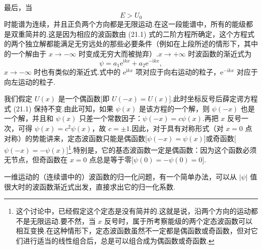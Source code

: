 最后，当
\begin{equation}
  E>U_0
\end{equation}
时能谱为连续，并且正负两个方向都是无限运动.在这一段能谱中，所有的能级都是双重简并的.这是因为相应的波函数由 (21.1) 式的二阶方程所确定，这个方程式的两个独立解都能满足无穷远处的那些必要条件（例如在上段所述的情形下，其中的一个解由于 $x\to-\infty$ 时变成无穷大而被抛弃）.$x\to+\infty$ 时波函数的渐近式为
\begin{equation}
  \psi=a_1\mathrm{e}^{\mathrm{i}kx}+a_2\mathrm{e}^{-\mathrm{i}kx},
\end{equation}
$x\to-\infty$ 时也有类似的渐近式.式中的 $\mathrm{e}^{\mathrm{i}kx}$ 项对应于向右运动的粒子，$\mathrm{e}^{-\mathrm{i}kx}$ 对应于向左运动的粒子.

我们假定 $U(x)$ 是一个偶函数[即 $U(-x)=U(x)$].此时坐标反号后薛定谔方程式 (21.1) 保持不变.由此可知，如果 $\psi(x)$ 是该方程的一个解，则 $\psi(-x)$ 也是一个解，并且和 $\psi(x)$ 只差一个常数因子：$\psi(-x)=c\psi(x)$.再把 $x$ 反号一次，可得 $\psi(x)=c^2\psi(x)$，故 $c=\pm 1$.因此，对于具有对称形式（对 $x=0$ 点对称）的势能讲来，定态波函数只能是偶函数[$\psi(-x)=\psi(x)$]或奇函数[$\psi(-x)=-\psi(x)$]\footnote{这个讨论中，已经假定这个定态是没有简并的.这就是说，沿两个方向的运动都不是无限运动.要不然，当 $x$ 反号时，属于所考察能级的两个定态波函数可以相互变换.在这种情形下，定态波函数虽然不一定都是偶函数或奇函数，但对它们进行适当的线性组合后，总是可以组合成为偶函数或奇函数.}.特别是，它的基态波函数一定是偶函数：因为这个函数必须无节点，但奇函数在 $x=0$ 点总是等于零[$\psi(0)=-\psi(0)=0$].

一维运动的（连续谱中的）波函数的归一化问题，有一个简单办法，可以从 $|\psi|$ 值很大时的波函数渐近式出发，直接求出它的归一化系数.

